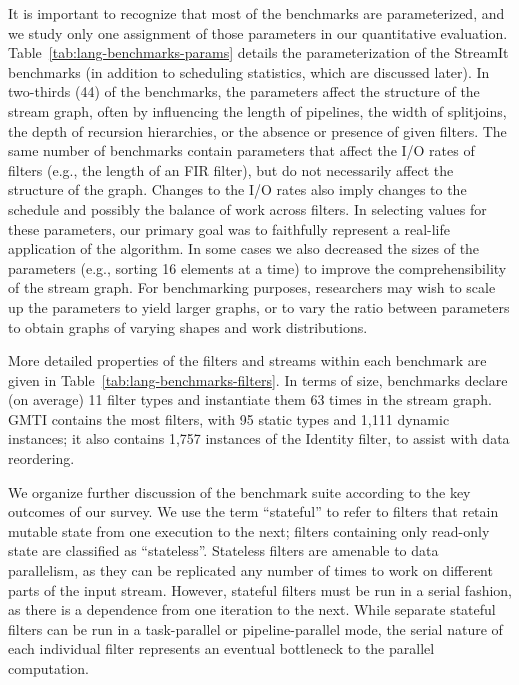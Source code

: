 It is important to recognize that most of the benchmarks are
parameterized, and we study only one assignment of those parameters in
our quantitative evaluation.  Table~\ref{tab:lang-benchmarks-params}
details the parameterization of the StreamIt benchmarks (in addition
to scheduling statistics, which are discussed later).  In two-thirds
(44) of the benchmarks, the parameters affect the structure of the
stream graph, often by influencing the length of pipelines, the width
of splitjoins, the depth of recursion hierarchies, or the absence or
presence of given filters.  The same number of benchmarks contain
parameters that affect the I/O rates of filters (e.g., the length of
an FIR filter), but do not necessarily affect the structure of the
graph.  Changes to the I/O rates also imply changes to the schedule
and possibly the balance of work across filters.  In selecting values
for these parameters, our primary goal was to faithfully represent a
real-life application of the algorithm.  In some cases we also
decreased the sizes of the parameters (e.g., sorting 16 elements at a
time) to improve the comprehensibility of the stream graph.  For
benchmarking purposes, researchers may wish to scale up the parameters
to yield larger graphs, or to vary the ratio between parameters to
obtain graphs of varying shapes and work distributions.

More detailed properties of the filters and streams within each
benchmark are given in Table~\ref{tab:lang-benchmarks-filters}.  In
terms of size, benchmarks declare (on average) 11 filter types and
instantiate them 63 times in the stream graph.  GMTI contains the most
filters, with 95 static types and 1,111 dynamic instances; it also
contains 1,757 instances of the Identity filter, to assist with data
reordering.

We organize further discussion of the benchmark suite according to the
key outcomes of our survey.  We use the term ``stateful'' to refer to
filters that retain mutable state from one execution to the next;
filters containing only read-only state are classified as
``stateless''.  Stateless filters are amenable to data parallelism, as
they can be replicated any number of times to work on different parts
of the input stream.  However, stateful filters must be run in a
serial fashion, as there is a dependence from one iteration to the
next.  While separate stateful filters can be run in a task-parallel
or pipeline-parallel mode, the serial nature of each individual filter
represents an eventual bottleneck to the parallel computation.

